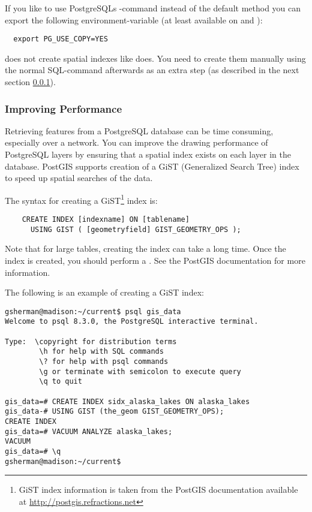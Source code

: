 If you like to use PostgreSQLs -command instead of the default
 method you can export the following
environment-variable (at least available on \nix and \osx):
\begin{verbatim}
  export PG_USE_COPY=YES
\end{verbatim}

 does not create spatial indexes like 
does. You need to create them manually using the normal SQL-command
 afterwards as an extra step (as described in the next
section \ref{label_improve}).

\subsubsection{Improving Performance} \label{label_improve}

Retrieving features from a PostgreSQL database can be time consuming,
especially over a network. You can improve the drawing performance of
PostgreSQL layers by ensuring that a  spatial
index
exists on each layer in the database. PostGIS supports creation of a
 GiST
(Generalized Search Tree) index to speed up spatial searches of the data.

The syntax for creating a GiST\footnote{GiST index information is taken from the PostGIS
documentation available at \url{http://postgis.refractions.net}}
index is:

\begin{verbatim}
    CREATE INDEX [indexname] ON [tablename] 
      USING GIST ( [geometryfield] GIST_GEOMETRY_OPS );
\end{verbatim}

Note that for large tables, creating the index can take a long time. Once the
index is created, you should perform a . See the
PostGIS documentation \cite{PostGISweb} for more information.

The following is an example of creating a GiST index:
\begin{verbatim}
gsherman@madison:~/current$ psql gis_data
Welcome to psql 8.3.0, the PostgreSQL interactive terminal.

Type:  \copyright for distribution terms
        \h for help with SQL commands
        \? for help with psql commands
        \g or terminate with semicolon to execute query
        \q to quit

gis_data=# CREATE INDEX sidx_alaska_lakes ON alaska_lakes
gis_data-# USING GIST (the_geom GIST_GEOMETRY_OPS);
CREATE INDEX
gis_data=# VACUUM ANALYZE alaska_lakes;
VACUUM
gis_data=# \q
gsherman@madison:~/current$
\end{verbatim}

